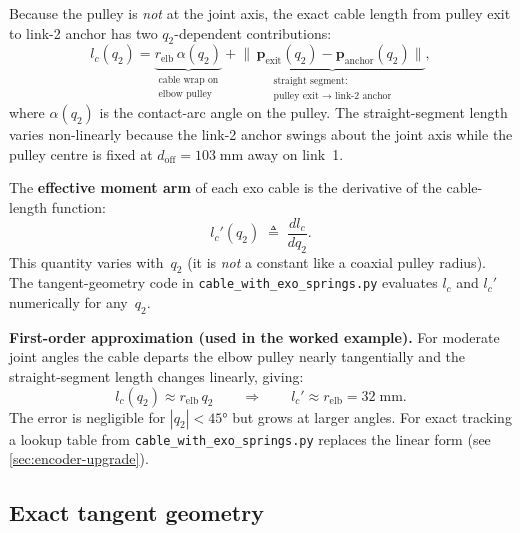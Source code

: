 \documentclass[11pt, a4paper]{article}
\begin{document}
Because the pulley is \emph{not} at the joint axis, the exact cable length
from pulley exit to link-2 anchor has two $q_2$-dependent contributions:
%
\begin{equation}\label{eq:cable-A-exact}
    l_c(q_2)
    = \underbrace{r_{\text{elb}}\,\alpha(q_2)}_{\substack{\text{cable wrap on}\\\text{elbow pulley}}}
    + \underbrace{\bigl\lVert\,\bm{p}_{\text{exit}}(q_2) - \bm{p}_{\text{anchor}}(q_2)\bigr\rVert}_{\substack{\text{straight segment:}\\\text{pulley exit } \to \text{ link-2 anchor}}},
\end{equation}
%
where $\alpha(q_2)$ is the contact-arc angle on the pulley.  The
straight-segment length varies non-linearly because the link-2 anchor swings
about the joint axis while the pulley centre is fixed at
$d_{\text{off}} = 103\;\text{mm}$ away on link~1.

The \textbf{effective moment arm} of each exo cable is the derivative of the
cable-length function:
%
\begin{equation}\label{eq:moment-arm-A}
    l_c'(q_2) \;\triangleq\; \frac{dl_c}{dq_2}.
\end{equation}
%
This quantity varies with~$q_2$ (it is \emph{not} a constant like a coaxial
pulley radius).  The tangent-geometry code in
\texttt{cable\_with\_exo\_springs.py} evaluates $l_c$ and $l_c'$
numerically for any~$q_2$.

\begin{mdframed}
\textbf{First-order approximation (used in the worked example).}\;
For moderate joint angles the cable departs the elbow pulley nearly
tangentially and the straight-segment length changes linearly, giving:
%
\begin{equation}\label{eq:approx-A}
    l_c(q_2) \approx r_{\text{elb}}\,q_2
    \qquad\Longrightarrow\qquad
    l_c' \approx r_{\text{elb}} = 32\;\text{mm}.
\end{equation}
%
The error is negligible for $|q_2| < 45°$ but grows at larger angles.
For exact tracking a lookup table from
\texttt{cable\_with\_exo\_springs.py} replaces the linear form
(see \cref{sec:encoder-upgrade}).
\end{mdframed}

\subsection{Exact tangent geometry}
\label{sec:tangent-geometry}
\end{document}
